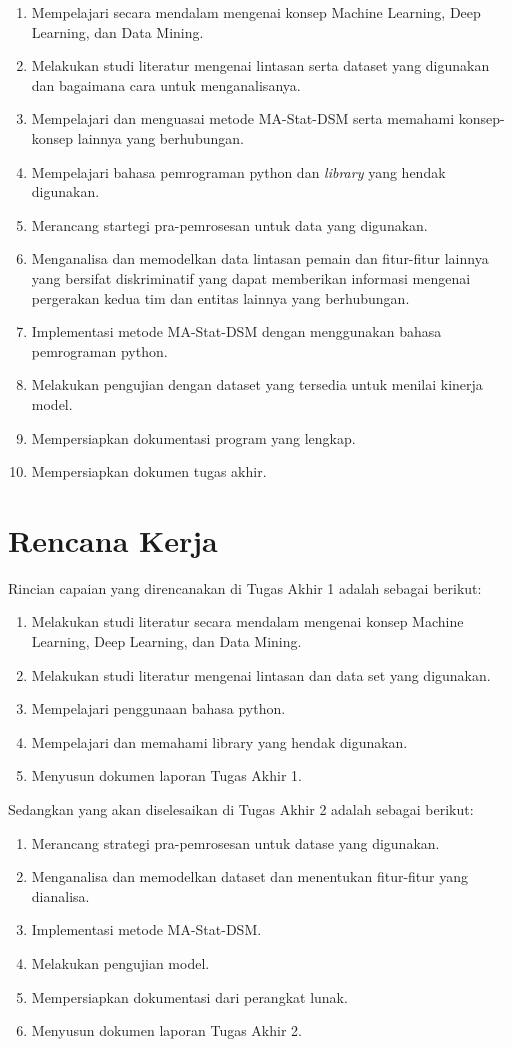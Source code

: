 \documentclass[a4paper,twoside]{article}
\begin{document}
	\begin{enumerate}
		\item Mempelajari secara mendalam mengenai konsep Machine Learning, Deep Learning, dan Data Mining.
		\item Melakukan studi literatur mengenai lintasan serta dataset yang digunakan dan bagaimana cara untuk menganalisanya.
		\item Mempelajari dan menguasai metode MA-Stat-DSM serta memahami konsep-konsep lainnya yang berhubungan.
		\item Mempelajari bahasa pemrograman python dan {\it library} yang hendak digunakan. 
		\item Merancang startegi pra-pemrosesan untuk data yang digunakan.
		\item Menganalisa dan memodelkan data lintasan pemain dan fitur-fitur lainnya yang bersifat diskriminatif yang dapat memberikan informasi mengenai pergerakan kedua tim dan entitas lainnya yang berhubungan.
		\item Implementasi metode MA-Stat-DSM dengan menggunakan bahasa pemrograman python.
		\item Melakukan pengujian dengan dataset yang tersedia untuk menilai kinerja model.
		\item Mempersiapkan dokumentasi program yang lengkap.
		\item Mempersiapkan dokumen tugas akhir. 
	\end{enumerate}
	
	\section{Rencana Kerja}
	Rincian capaian yang direncanakan di Tugas Akhir 1 adalah sebagai berikut:
	\begin{enumerate}
		\item Melakukan studi literatur secara mendalam mengenai konsep Machine Learning, Deep Learning, dan Data Mining.
		\item Melakukan studi literatur mengenai lintasan dan data set yang digunakan.
		\item Mempelajari penggunaan bahasa python.
		\item Mempelajari dan memahami library yang hendak digunakan.
		\item Menyusun dokumen laporan Tugas Akhir 1.
	\end{enumerate}
	
	Sedangkan yang akan diselesaikan di Tugas Akhir 2 adalah sebagai berikut:
	\begin{enumerate}
		\item Merancang strategi pra-pemrosesan untuk datase yang digunakan.
		\item Menganalisa dan memodelkan dataset dan menentukan fitur-fitur yang dianalisa.
		\item Implementasi metode MA-Stat-DSM.
		\item Melakukan pengujian model.
		\item Mempersiapkan dokumentasi dari perangkat lunak.
		\item Menyusun dokumen laporan Tugas Akhir 2.
	\end{enumerate}
	
\end{document}
